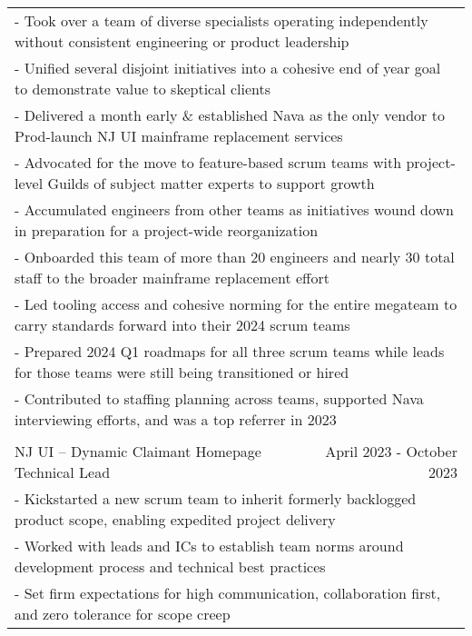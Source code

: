 \documentclass[letterpaper]{article}
\begin{document}
\begin{center}
\begin{tabular}{p{}p{}r}
			  \multicolumn{3}{p{\textwidth}}{\quad\quad - Took over a team of diverse specialists operating independently without consistent engineering or product leadership} \\
			  \multicolumn{3}{p{\textwidth}}{\quad\quad - Unified several disjoint initiatives into a cohesive end of year goal to demonstrate value to skeptical clients} \\
			  \multicolumn{3}{p{\textwidth}}{\quad\quad - Delivered a month early \& established Nava as the only vendor to Prod-launch NJ UI mainframe replacement services} \\
			  \multicolumn{3}{p{\textwidth}}{\quad\quad - Advocated for the move to feature-based scrum teams with project-level Guilds of subject matter experts to support growth} \\
			  \multicolumn{3}{p{\textwidth}}{\quad\quad - Accumulated engineers from other teams as initiatives wound down in preparation for a project-wide reorganization} \\
			  \multicolumn{3}{p{\textwidth}}{\quad\quad - Onboarded this team of more than 20 engineers and nearly 30 total staff to the broader mainframe replacement effort} \\
			  \multicolumn{3}{p{\textwidth}}{\quad\quad - Led tooling access and cohesive norming for the entire megateam to carry standards forward into their 2024 scrum teams} \\
			  \multicolumn{3}{p{\textwidth}}{\quad\quad - Prepared 2024 Q1 roadmaps for all three scrum teams while leads for those teams were still being transitioned or hired} \\
			  \multicolumn{3}{p{\textwidth}}{\quad\quad - Contributed to staffing planning across teams, supported Nava interviewing efforts, and was a top referrer in 2023} 
		  \\
		  \\		%
			  \multicolumn{2}{p{0.5\textwidth}}{\quad NJ UI -- Dynamic Claimant Homepage Technical Lead}
			  &
			  {April 2023 - October 2023 \quad\quad\quad\quad}
		  \\
			  \multicolumn{3}{p{\textwidth}}{\quad\quad - Kickstarted a new scrum team to inherit formerly backlogged product scope, enabling expedited project delivery} \\
			  \multicolumn{3}{p{\textwidth}}{\quad\quad - Worked with leads and ICs to establish team norms around development process and technical best practices} \\
			  \multicolumn{3}{p{\textwidth}}{\quad\quad - Set firm expectations for high communication, collaboration first, and zero tolerance for scope creep} \\

\end{tabular}
\end{center}
\end{document}
